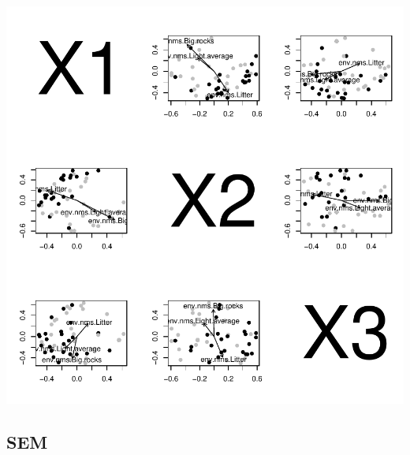 \documentclass[12pt]{article}
\begin{document}
\includegraphics{SCRL-013}




\pagebreak

\subsection{SEM}

\end{document}
